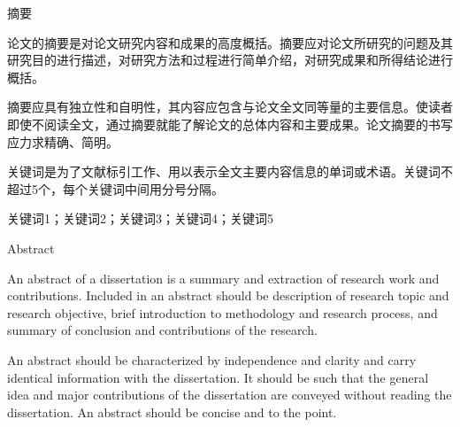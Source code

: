 \documentclass[12pt,a4paper]{ctexart}
\begin{document}
\newpage
\clearpage
{}
\setcounter{page}{2}

\enlargethispage{\baselineskip}
\vspace*{-\topskip}
\begin{center}
    \heiti {} 摘\hspace{1em}要
\end{center}
\vspace{0.1cm}

 \songti 
\noindent\hspace{2em}论文的摘要是对论文研究内容和成果的高度概括。摘要应对论文所研究的问题及其研究目的进行描述，对研究方法和过程进行简单介绍，对研究成果和所得结论进行概括。
    
\noindent\hspace{2em}摘要应具有独立性和自明性，其内容应包含与论文全文同等量的主要信息。使读者即使不阅读全文，通过摘要就能了解论文的总体内容和主要成果。论文摘要的书写应力求精确、简明。
    
\noindent\hspace{2em}关键词是为了文献标引工作、用以表示全文主要内容信息的单词或术语。关键词不超过5个，每个关键词中间用分号分隔。
    
\vspace{1em}
\songti 关键词1；关键词2；关键词3；关键词4；关键词5

\newpage
\enlargethispage{\baselineskip} %
\vspace*{-\topskip} %
\begin{center}
    \heiti {} Abstract
\end{center}
\vspace{0.1cm}

\selectfont %
\noindent\hspace{2em}An abstract of a dissertation is a summary and extraction of research work and contributions. Included in an abstract should be description of research topic and research objective, brief introduction to methodology and research process, and summary of conclusion and contributions of the research.

\noindent\hspace{2em}An abstract should be characterized by independence and clarity and carry identical information with the dissertation. It should be such that the general idea and major contributions of the dissertation are conveyed without reading the dissertation. An abstract should be concise and to the point.
\end{document}
